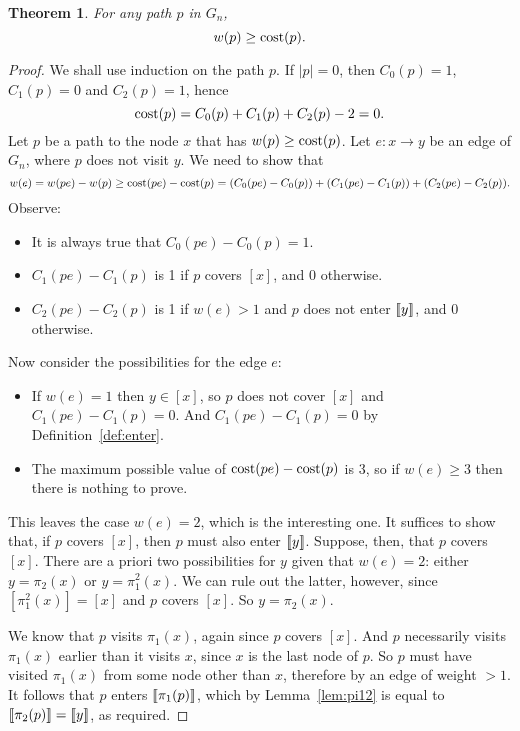\documentclass[a4paper]{article}
\newtheorem{thm}{Theorem}
\theoremstyle{definition}
\theoremstyle{remark}
\begin{document}
\begin{thm}\label{thm:cost}
    For any path $p$ in $G_n$,
    \[
        w(p) \ge \mathrm{cost}(p).
    \]
\end{thm}
\begin{proof}
    We shall use induction on the path $p$.
    If $|p|=0$, then $C_0(p)=1$, $C_1(p)=0$ and $C_2(p)=1$, hence
    \[
        \mathrm{cost}(p) = C_0(p) + C_1(p) + C_2(p) - 2 = 0.
    \]
    Let $p$ be a path to the node $x$ that has $w(p) \ge \mathrm{cost}(p)$. Let $e: x\to y$ be an edge of $G_n$, where $p$ does not visit $y$. We need to show that
    \[
        w(e) = w(pe) - w(p) \ge \mathrm{cost}(pe) - \mathrm{cost}(p) = (C_0(pe)-C_0(p)) + (C_1(pe)-C_1(p)) + (C_2(pe)-C_2(p)).
    \]
    Observe:
    \begin{itemize}
        \item It is always true that $C_0(pe)-C_0(p) = 1$.
        \item $C_1(pe)-C_1(p)$ is 1 if $p$ covers $[x]$, and 0 otherwise.
        \item $C_2(pe)-C_2(p)$ is 1 if $w(e)>1$ and $p$ does not enter $\llbracket y\rrbracket$, and 0 otherwise.
    \end{itemize}

    Now consider the possibilities for the edge $e$:
    \begin{itemize}
        \item If $w(e) = 1$ then $y\in[x]$, so $p$ does not cover $[x]$ and $C_1(pe)-C_1(p)=0$. And $C_1(pe)-C_1(p) = 0$ by Definition~\ref{def:enter}.
        \item The maximum possible value of $\mathrm{cost}(pe) - \mathrm{cost}(p)$ is 3, so if $w(e)\ge 3$ then there is nothing to prove.
    \end{itemize}
    This leaves the case $w(e)=2$, which is the interesting one. It suffices to show that, if $p$ covers $[x]$, then $p$ must also enter $\llbracket y\rrbracket$. Suppose, then, that $p$ covers $[x]$. There are a priori two possibilities for $y$ given that $w(e)=2$: either $y=\pi_2(x)$ or $y=\pi_1^2(x)$. We can rule out the latter, however, since $[\pi_1^2(x)]=[x]$ and $p$ covers $[x]$. So $y=\pi_2(x)$.

    We know that $p$ visits $\pi_1(x)$, again since $p$ covers $[x]$. And $p$ necessarily visits $\pi_1(x)$ earlier than it visits $x$, since $x$ is the last node of $p$. So $p$ must have visited $\pi_1(x)$ from some node other than $x$, therefore by an edge of weight ${}>1$. It follows that $p$ enters $\llbracket\pi_1(p)\rrbracket$, which by Lemma~\ref{lem:pi12} is equal to $\llbracket\pi_2(p)\rrbracket = \llbracket y\rrbracket$, as required.
\end{proof}
\end{document}
